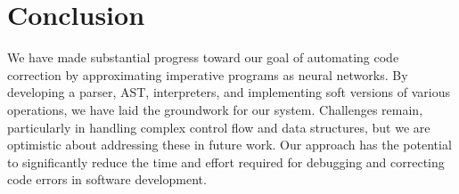 \documentclass{article}
\begin{document}
\section{Conclusion}

We have made substantial progress toward our goal of automating code correction by approximating imperative programs as neural networks. By developing a parser, AST, interpreters, and implementing soft versions of various operations, we have laid the groundwork for our system. Challenges remain, particularly in handling complex control flow and data structures, but we are optimistic about addressing these in future work. Our approach has the potential to significantly reduce the time and effort required for debugging and correcting code errors in software development.



\end{document}
